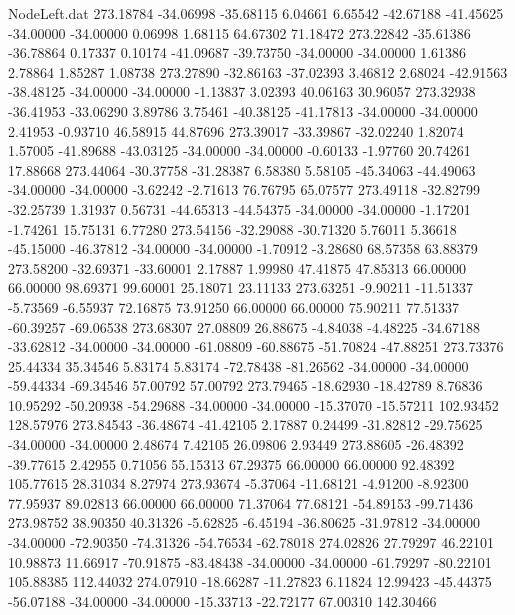 \begin{filecontents}{NodeLeft.dat}
 273.18784  -34.06998  -35.68115     6.04661    6.65542  -42.67188  -41.45625  -34.00000  -34.00000    0.06998    1.68115   64.67302   71.18472
 273.22842  -35.61386  -36.78864     0.17337    0.10174  -41.09687  -39.73750  -34.00000  -34.00000    1.61386    2.78864    1.85287    1.08738
 273.27890  -32.86163  -37.02393     3.46812    2.68024  -42.91563  -38.48125  -34.00000  -34.00000   -1.13837    3.02393   40.06163   30.96057
 273.32938  -36.41953  -33.06290     3.89786    3.75461  -40.38125  -41.17813  -34.00000  -34.00000    2.41953   -0.93710   46.58915   44.87696
 273.39017  -33.39867  -32.02240     1.82074    1.57005  -41.89688  -43.03125  -34.00000  -34.00000   -0.60133   -1.97760   20.74261   17.88668
 273.44064  -30.37758  -31.28387     6.58380    5.58105  -45.34063  -44.49063  -34.00000  -34.00000   -3.62242   -2.71613   76.76795   65.07577
 273.49118  -32.82799  -32.25739     1.31937    0.56731  -44.65313  -44.54375  -34.00000  -34.00000   -1.17201   -1.74261   15.75131    6.77280
 273.54156  -32.29088  -30.71320     5.76011    5.36618  -45.15000  -46.37812  -34.00000  -34.00000   -1.70912   -3.28680   68.57358   63.88379
 273.58200  -32.69371  -33.60001     2.17887    1.99980   47.41875   47.85313   66.00000   66.00000   98.69371   99.60001   25.18071   23.11133
 273.63251   -9.90211  -11.51337    -5.73569   -6.55937   72.16875   73.91250   66.00000   66.00000   75.90211   77.51337  -60.39257  -69.06538
 273.68307   27.08809   26.88675    -4.84038   -4.48225  -34.67188  -33.62812  -34.00000  -34.00000  -61.08809  -60.88675  -51.70824  -47.88251
 273.73376   25.44334   35.34546     5.83174    5.83174  -72.78438  -81.26562  -34.00000  -34.00000  -59.44334  -69.34546   57.00792   57.00792
 273.79465  -18.62930  -18.42789     8.76836   10.95292  -50.20938  -54.29688  -34.00000  -34.00000  -15.37070  -15.57211  102.93452  128.57976
 273.84543  -36.48674  -41.42105     2.17887    0.24499  -31.82812  -29.75625  -34.00000  -34.00000    2.48674    7.42105   26.09806    2.93449
 273.88605  -26.48392  -39.77615     2.42955    0.71056   55.15313   67.29375   66.00000   66.00000   92.48392  105.77615   28.31034    8.27974
 273.93674   -5.37064  -11.68121    -4.91200   -8.92300   77.95937   89.02813   66.00000   66.00000   71.37064   77.68121  -54.89153  -99.71436
 273.98752   38.90350   40.31326    -5.62825   -6.45194  -36.80625  -31.97812  -34.00000  -34.00000  -72.90350  -74.31326  -54.76534  -62.78018
 274.02826   27.79297   46.22101    10.98873   11.66917  -70.91875  -83.48438  -34.00000  -34.00000  -61.79297  -80.22101  105.88385  112.44032
 274.07910  -18.66287  -11.27823     6.11824   12.99423  -45.44375  -56.07188  -34.00000  -34.00000  -15.33713  -22.72177   67.00310  142.30466

\end{filecontents}
